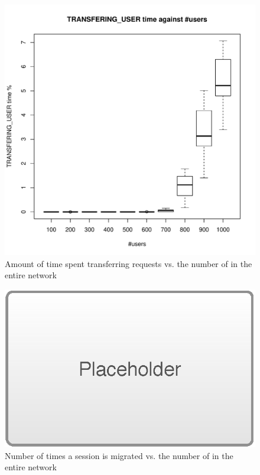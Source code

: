 \begin{figure}[tb]
	\centering
	\includegraphics[width=\linewidth]{TRANSFERING_USER.pdf} 
	\caption{Amount of time spent transferring requests vs. the number of \ues in the entire network}
	\label{fig:transferring}
\end{figure}

\begin{figure}[tb]
	\centering
	\includegraphics[width=\linewidth]{placeholder.eps} 
	\caption{Number of times a session is migrated vs. the number of \ues{} in the entire network}
	\label{fig:session_migration}
\end{figure}

